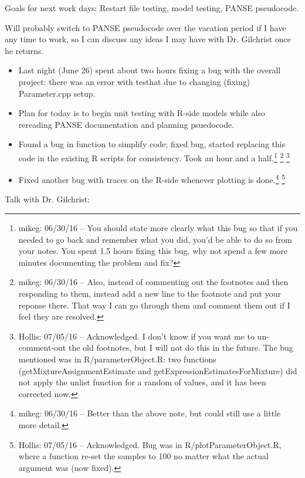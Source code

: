 \documentclass[12pt,hyperref]{labbook}
\begin{document}
Goals for next work days: Restart file testing, model testing, PANSE pseudocode.

Will probably switch to PANSE pseudocode over the vacation period if I have any time to work,
so I can discuss any ideas I may have with Dr. Gilchrist once he returns.



\begin{itemize}
\item 
Last night (June 26) spent about two hours fixing a bug with the overall project:
there was an error with testhat due to changing (fixing) Parameter.cpp setup.
\item
Plan for today is to begin unit testing with R-side models while also rereading PANSE
documentation and planning psuedocode.
\item
Found a bug in function to simplify code; fixed bug, started replacing this code
in the existing R scripts for consistency. 
Took an hour and a half.\footnote{mikeg: 06/30/16 -- You should state more clearly what this bug so that if you needed to go back and remember what you did, you'd be able to do so from your notes.
You spent 1.5 hours fixing this bug, why not spend a few more minutes documenting the problem and fix?}
\footnote{mikeg: 06/30/16 -- Also, instead of commenting out the footnotes and then responding to them, instead add a new line to the footnote and put your reponse there.
That way I can go through them and comment them out if I feel they are resolved.
} 
\footnote{Hollis: 07/05/16 -- Acknowledged. 
I don't know if you want me to un-comment-out the old footnotes, but I will not do this in the future.
The bug mentioned was in R/parameterObject.R: two functions (getMixtureAssignmentEstimate and getExpressionEstimatesForMixture) did not apply the unlist function for a random of values, and it has been corrected now.}
\item
Fixed another bug with traces on the R-side whenever plotting is done.\footnote{mikeg: 06/30/16 -- Better than the above note, but could still use a little more detail.}
\footnote{Hollis: 07/05/16 -- Acknowledged. 
Bug was in R/plotParameterObject.R, where a function re-set the samples to 100 no matter what the actual argument was (now fixed).}
\end{itemize}

Talk with Dr. Gilchrist:
\end{document}
